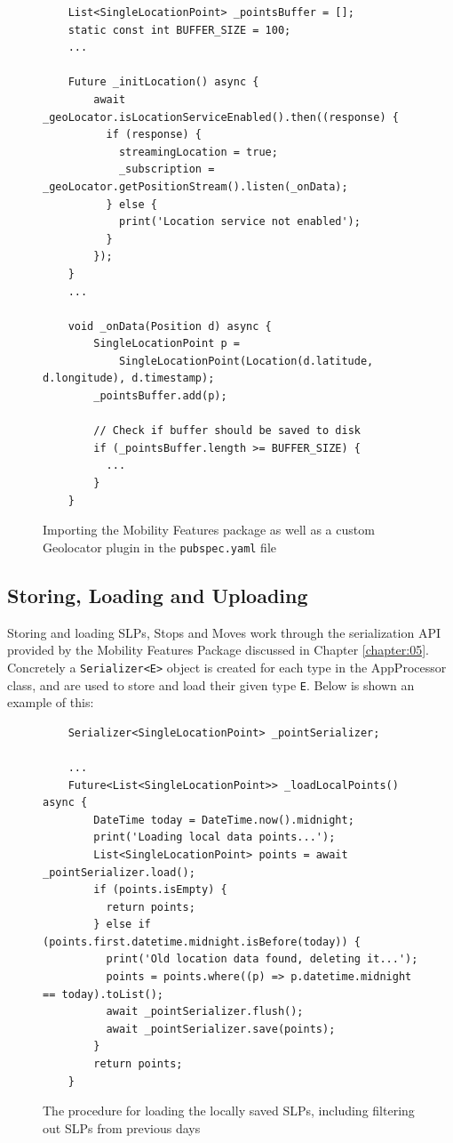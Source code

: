 \begin{figure}
    \centering
    \begin{verbatim}
    List<SingleLocationPoint> _pointsBuffer = [];
    static const int BUFFER_SIZE = 100;
    ...
    
    Future _initLocation() async {
        await _geoLocator.isLocationServiceEnabled().then((response) {
          if (response) {
            streamingLocation = true;
            _subscription = _geoLocator.getPositionStream().listen(_onData);
          } else {
            print('Location service not enabled');
          }
        });
    }
    ...
    
    void _onData(Position d) async {
        SingleLocationPoint p =
            SingleLocationPoint(Location(d.latitude, d.longitude), d.timestamp);
        _pointsBuffer.add(p);
    
        // Check if buffer should be saved to disk
        if (_pointsBuffer.length >= BUFFER_SIZE) {
          ...
        }
    }
    \end{verbatim}
    \caption{Importing the Mobility Features package as well as a custom Geolocator plugin in the \verb|pubspec.yaml| file}
    \label{fig:import-package}
\end{figure}



\subsection{Storing, Loading and Uploading}
Storing and loading SLPs, Stops and Moves work through the serialization API provided by the Mobility Features Package discussed in Chapter \ref{chapter:05}. Concretely a \verb|Serializer<E>| object is created for each type in the AppProcessor class, and are used to store and load their given type \verb|E|. Below is shown an example of this:



\begin{figure}
    \centering
    \begin{verbatim}
    Serializer<SingleLocationPoint> _pointSerializer;
    
    ...
    Future<List<SingleLocationPoint>> _loadLocalPoints() async {
        DateTime today = DateTime.now().midnight;
        print('Loading local data points...');
        List<SingleLocationPoint> points = await _pointSerializer.load();
        if (points.isEmpty) {
          return points;
        } else if (points.first.datetime.midnight.isBefore(today)) {
          print('Old location data found, deleting it...');
          points = points.where((p) => p.datetime.midnight == today).toList();
          await _pointSerializer.flush();
          await _pointSerializer.save(points);
        }
        return points;
    }
    \end{verbatim}
    \caption{The procedure for loading the locally saved SLPs, including filtering out SLPs from previous days}
    \label{fig:points-serialization}
\end{figure}


